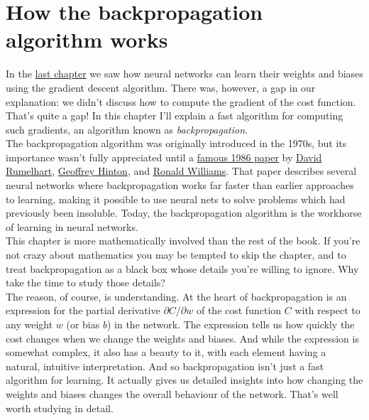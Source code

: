 \chapter{How the backpropagation algorithm works}
\label{chap: backpropagation}

In the \hyperref[chap: NN Handwriting]{last chapter} we saw how neural networks can learn their weights and biases using the gradient descent algorithm. There was, however, a gap in our explanation: we didn't discuss how to compute the gradient of the cost function. That's quite a gap! In this chapter I'll explain a fast algorithm for computing such gradients, an algorithm known as \textit{backpropagation}.\\

The backpropagation algorithm was originally introduced in the 1970s, but its importance wasn't fully appreciated until a \href{https://www.nature.com/articles/323533a0}{famous 1986 paper} by \href{https://en.wikipedia.org/wiki/David_Rumelhart}{David Rumelhart}, \href{https://www.cs.toronto.edu/~hinton/}{Geoffrey Hinton}, and \href{https://en.wikipedia.org/wiki/Ronald_J._Williams}{Ronald Williams}. That paper describes several neural networks where backpropagation works far faster than earlier approaches to learning, making it possible to use neural nets to solve problems which had previously been insoluble. Today, the backpropagation algorithm is the workhorse of learning in neural networks.\\

This chapter is more mathematically involved than the rest of the book. If you're not crazy about mathematics you may be tempted to skip the chapter, and to treat backpropagation as a black box whose details you're willing to ignore. Why take the time to study those details?\\

The reason, of course, is understanding. At the heart of backpropagation is an expression for the partial derivative $\partial C/\partial w$ of the cost function $C$ with respect to any weight $w$ (or bias $b$) in the network. The expression tells us how quickly the cost changes when we change the weights and biases. And while the expression is somewhat complex, it also has a beauty to it, with each element having a natural, intuitive interpretation. And so backpropagation isn't just a fast algorithm for learning. It actually gives us detailed insights into how changing the weights and biases changes the overall behaviour of the network. That's well worth studying in detail.\\

